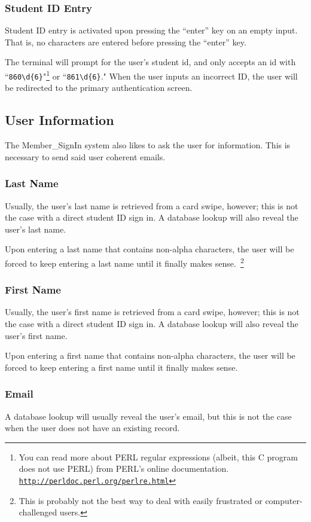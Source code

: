 \documentclass[12pt]{article}
\begin{document}
		\subsubsection{Student ID Entry}
Student ID entry is activated upon pressing the ``enter'' \Return key on an 
empty input.  That is, no characters are entered before pressing the ``enter''
\Return key.

The terminal will prompt for the user's student id, and only accepts an id
with ``{\tt860\textbackslash d\{6\}}"\footnote{You can read more about PERL
regular
 expressions (albeit, this C program does not use PERL) from PERL's online
 documentation. {\tt\url{http://perldoc.perl.org/perlre.html}}
} or ``{\tt861\textbackslash d\{6\}}."  When the user inputs an incorrect ID,
the user will be redirected to the primary authentication screen.
	\subsection{User Information}
The Member\_SignIn system also likes to ask the user for information.  This is
necessary to send said user coherent emails.
		\subsubsection{Last Name}
Usually, the user's last name is retrieved from a card swipe, however; this is
not the case with a direct student ID sign in.  A database lookup will also
reveal the user's last name.

Upon entering a last name that contains non-alpha characters, the user will be
forced to keep entering a last name until it finally makes sense.\
\footnote{This is probably not the best way to deal with easily frustrated
or computer-challenged users.}
		\subsubsection{First Name}
Usually, the user's first name is retrieved from a card swipe, however; this is
not the case with a direct student ID sign in.  A database lookup will also
reveal the user's first name.

Upon entering a first name that contains non-alpha characters, the user will be
forced to keep entering a first name until it finally makes sense.
		\subsubsection{Email}
A database lookup will usually reveal the user's email, but this is not the
case when the user does not have an existing record.
\end{document}

